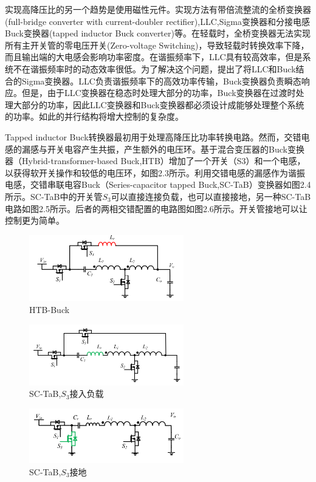 \documentclass[12pt,a4paper]{report}
\begin{document}
实现高降压比的另一个趋势是使用磁性元件。实现方法有带倍流整流的全桥变换器(full-bridge converter with current-doubler rectifier),LLC,Sigma变换器和分接电感Buck变换器(tapped inductor Buck converter)等。在轻载时，全桥变换器无法实现所有主开关管的零电压开关(Zero-voltage Switching)，导致轻载时转换效率下降，而且输出端的大电感会影响功率密度。在谐振频率下，LLC具有较高效率，但是系统不在谐振频率时的动态效率很低。为了解决这个问题，提出了将LLC和Buck结合的Sigma变换器。LLC负责谐振频率下的高效功率传输，Buck变换器负责瞬态响应。但是，由于LLC变换器在稳态时处理大部分的功率，Buck变换器在过渡时处理大部分的功率，因此LLC变换器和Buck变换器都必须设计成能够处理整个系统的功率。如此的并行结构将增大控制的复杂度。


Tapped inductor Buck转换器最初用于处理高降压比功率转换电路。然而，交错电感的漏感与开关电容产生共振，产生额外的电压环。基于混合变压器的Buck变换器（Hybrid-transformer-based Buck,HTB）增加了一个开关（S3）和一个电感，以获得软开关操作和较低的电压环，如图2.3所示。利用交错电感的漏感作为谐振电感，交错串联电容Buck（Series-capacitor tapped Buck,SC-TaB）变换器如图2.4所示。SC-TaB中的开关管$S_3$可以直接连接负载，也可以直接接地，另一种SC-TaB电路如图2.5所示。后者的两相交错配置的电路图如图2.6所示。开关管接地可以让控制更为简单。
\newline

\begin{figure}[h]
    \centering
    \includegraphics[width = 0.6\textwidth]{figures/HTB-Buck.png}
    \caption{HTB-Buck}
\end{figure}

\begin{figure}[h]
    \centering
    \includegraphics[width = 0.6\textwidth]{figures/SC-TaB1.png}
    \caption{SC-TaB,$S_3$接入负载}
\end{figure}

\begin{figure}[h]
    \centering
    \includegraphics[width = 0.6\textwidth]{figures/SC-TaB.png}
    \caption{SC-TaB,$S_3$接地}
\end{figure}
\end{document}
